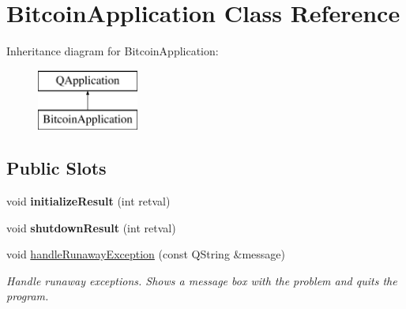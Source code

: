 \hypertarget{class_bitcoin_application}{}\section{Bitcoin\+Application Class Reference}
\label{class_bitcoin_application}
Inheritance diagram for Bitcoin\+Application\+:\begin{figure}[H]
\begin{center}
\leavevmode
\includegraphics[height=2.000000cm]{class_bitcoin_application}
\end{center}
\end{figure}
\subsection*{Public Slots}
\begin{DoxyCompactItemize}
\item 
\mbox{\label{class_bitcoin_application_aceb08b4063e4fb264cf11cf7f9edd969}} 
void {\bfseries initialize\+Result} (int retval)
\item 
\mbox{\label{class_bitcoin_application_ab5f7ccaede7e0bd417627c03ccbe20e6}} 
void {\bfseries shutdown\+Result} (int retval)
\item 
\mbox{\label{class_bitcoin_application_a77999ba9fde6eaaa0f9a0d4313ca3855}} 
void \mbox{\hyperlink{class_bitcoin_application_a77999ba9fde6eaaa0f9a0d4313ca3855}{handle\+Runaway\+Exception}} (const Q\+String \&message)
\begin{DoxyCompactList}\small\item\em Handle runaway exceptions. Shows a message box with the problem and quits the program. \end{DoxyCompactList}\end{DoxyCompactItemize}
